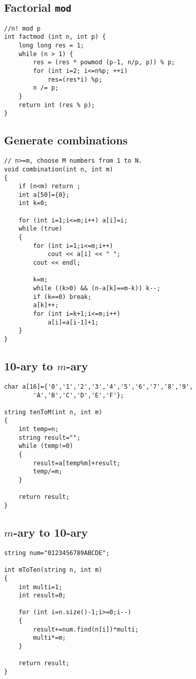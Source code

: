 \documentclass[a4paper]{article}
\begin{document}
\subsection{Factorial \texttt{mod}}

\begin{verbatim}
//n! mod p
int factmod (int n, int p) {
	long long res = 1;
	while (n > 1) {
		res = (res * powmod (p-1, n/p, p)) % p;
		for (int i=2; i<=n%p; ++i)
			res=(res*i) %p;
		n /= p;
	}
	return int (res % p);
}
\end{verbatim}

\subsection{Generate combinations}
\begin{verbatim}
// n>=m, choose M numbers from 1 to N.
void combination(int n, int m)
{
	if (n<m) return ;
	int a[50]={0};
	int k=0;

	for (int i=1;i<=m;i++) a[i]=i;
	while (true)
	{
		for (int i=1;i<=m;i++)
			cout << a[i] << " ";
		cout << endl;

		k=m;
		while ((k>0) && (n-a[k]==m-k)) k--;
		if (k==0) break;
		a[k]++;
		for (int i=k+1;i<=m;i++)
			a[i]=a[i-1]+1;
	}
}
\end{verbatim}

\subsection{10-ary to $m$-ary}
\begin{verbatim}
char a[16]={'0','1','2','3','4','5','6','7','8','9',
		'A','B','C','D','E','F'};

string tenToM(int n, int m)
{
	int temp=n;
	string result="";
	while (temp!=0)
	{
		result=a[temp%m]+result;
		temp/=m;
	}

	return result;
}
\end{verbatim}

\subsection{$m$-ary to 10-ary}

\begin{verbatim}
string num="0123456789ABCDE";

int mToTen(string n, int m)
{
	int multi=1;
	int result=0;

	for (int i=n.size()-1;i>=0;i--)
	{
		result+=num.find(n[i])*multi;
		multi*=m;
	}

	return result;
}
\end{verbatim}
\end{document}
